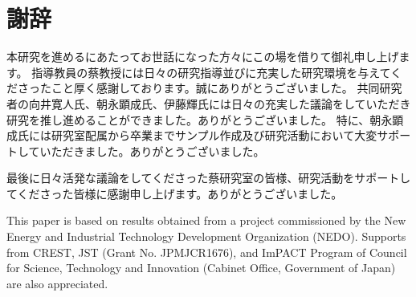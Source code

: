 \section*{謝辞}
本研究を進めるにあたってお世話になった方々にこの場を借りて御礼申し上げます。
指導教員の蔡教授には日々の研究指導並びに充実した研究環境を与えてくださったこと厚く感謝しております。誠にありがとうございました。
共同研究者の向井寛人氏、朝永顕成氏、伊藤輝氏には日々の充実した議論をしていただき研究を推し進めることができました。ありがとうございました。
特に、朝永顕成氏には研究室配属から卒業までサンプル作成及び研究活動において大変サポートしていただきました。ありがとうございました。

最後に日々活発な議論をしてくださった蔡研究室の皆様、研究活動をサポートしてくださった皆様に感謝申し上げます。ありがとうございました。


This paper is based on results obtained from a project commissioned by the New Energy and
Industrial Technology Development Organization (NEDO). Supports from CREST, JST (Grant
No. JPMJCR1676), and ImPACT Program of Council for Science, Technology and Innovation
(Cabinet Office, Government of Japan) are also appreciated.